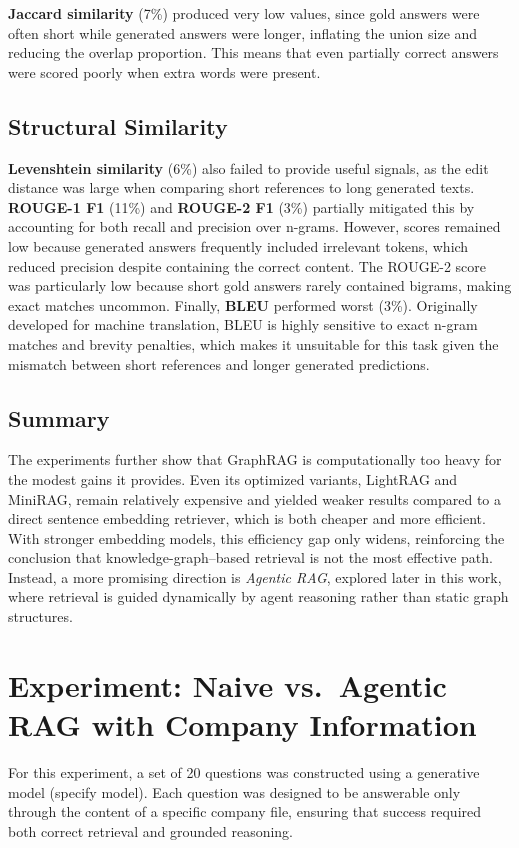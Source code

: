\textbf{Jaccard similarity} (7\%) produced very low values, since gold answers were often short while generated answers were longer, inflating the union size and reducing the overlap proportion. 
This means that even partially correct answers were scored poorly when extra words were present.

\subsection{Structural Similarity} 
\textbf{Levenshtein similarity} (6\%) also failed to provide useful signals, as the edit distance was large when comparing short references to long generated texts.  
\textbf{ROUGE-1 F1} (11\%) and \textbf{ROUGE-2 F1} (3\%) partially mitigated this by accounting for both recall and precision over n-grams. 
However, scores remained low because generated answers frequently included irrelevant tokens, which reduced precision despite containing the correct content. 
The ROUGE-2 score was particularly low because short gold answers rarely contained bigrams, making exact matches uncommon.  
Finally, \textbf{BLEU} performed worst (3\%). 
Originally developed for machine translation, BLEU is highly sensitive to exact n-gram matches and brevity penalties, which makes it unsuitable for this task given the mismatch between short references and longer generated predictions.

\subsection{Summary}
The experiments further show that GraphRAG is computationally too heavy for the modest gains it provides. 
Even its optimized variants, LightRAG and MiniRAG, remain relatively expensive and yielded weaker results compared to a direct sentence embedding retriever, which is both cheaper and more efficient. 
With stronger embedding models, this efficiency gap only widens, reinforcing the conclusion that knowledge-graph–based retrieval is not the most effective path. 
Instead, a more promising direction is \emph{Agentic RAG}, explored later in this work, where retrieval is guided dynamically by agent reasoning rather than static graph structures.

\section{Experiment: Naive vs.\ Agentic RAG with Company Information}

For this experiment, a set of 20 questions was constructed using a generative model (specify model). Each question was designed to be answerable only through the content of a specific company file, ensuring that success required both correct retrieval and grounded reasoning.  

